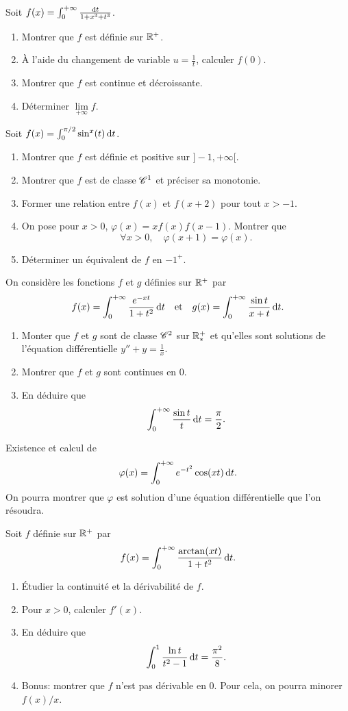 \documentclass{yann}
\begin{document}
\Exercice

Soit $f(x) = \int_0^{+\infty} \frac{\mathop{}\!\mathrm{d} t}{1+x^3+t^3}$.
\begin{enumerate}
\item
Montrer que $f$ est définie sur $\mathbb{R}^+$.
\item
À l'aide du changement de variable $u = \frac1t$, calculer $f(0)$.
\item
Montrer que $f$ est continue et décroissante.
\item
Déterminer $\lim\limits_{+\infty} f$.
\end{enumerate}

\Exercice

Soit $f(x) = \int_0^{\pi/2} \sin^x(t) \mathop{}\!\mathrm{d} t$.
\begin{enumerate}
\item
Montrer que $f$ est définie et positive sur $]-1,+\infty[$.
  \item
Montrer que $f$ est de classe $\mathscr{C}^{1}$ et préciser sa monotonie.
  \item
Former une relation entre $f(x)$ et $f(x+2)$ pour tout $x > -1$.
  \item
On pose pour $x > 0$, $\varphi(x) = xf(x)f(x-1)$.
    Montrer que
    \[ \forall x > 0, \quad\varphi(x+1) =\varphi(x). \]
  \item
Déterminer un équivalent de $f$ en $-1^+$.
\end{enumerate}

\Exercice

On considère les fonctions $f$ et $g$ définies sur $\mathbb{R}^+$ par
\[ f(x) = \int_0^{+\infty} \frac{e^{-xt}}{1+t^2} \mathop{}\!\mathrm{d} t
\quad\text{et}\quad
g(x) = \int_0^{+\infty} \frac{\sin t}{x+t} \mathop{}\!\mathrm{d} t. \]
\begin{enumerate}
\item
Monter que $f$ et $g$ sont de classe $\mathscr{C}^{2}$ sur $\mathbb{R}^+_*$ et
  qu'elles sont solutions de l'équation différentielle
  $y'' + y = \frac1x$.
\item
Montrer que $f$ et $g$ sont continues en $0$.
\item
En déduire que \[ \int_0^{+\infty} \frac{\sin t}{t} \mathop{}\!\mathrm{d} t = \frac\pi2. \]
\end{enumerate}

\Exercice

Existence et calcul de
\[ \varphi(x) = \int_0^{+\infty} e^{-t^2} \cos(xt) \mathop{}\!\mathrm{d} t. \]
On pourra montrer que $\varphi$ est solution d'une équation différentielle
que l'on résoudra.

\Exercice

Soit $f$ définie sur $\mathbb{R}^+$ par \[ f(x) = \int_0^{+\infty} \frac{\arctan(xt)}{1+t^2} \mathop{}\!\mathrm{d} t. \]
\begin{enumerate}
\item
Étudier la continuité et la dérivabilité de $f$.
\item
Pour $x > 0$, calculer $f'(x)$.
\item
En déduire que \[ \int_0^1 \frac{\ln t}{t^2-1} \mathop{}\!\mathrm{d} t = \frac{\pi^2}{8}. \]
\item
  Bonus: montrer que $f$ n'est pas dérivable en $0$.
  Pour cela, on pourra minorer $f(x)/x$.
\end{enumerate}
\end{document}
